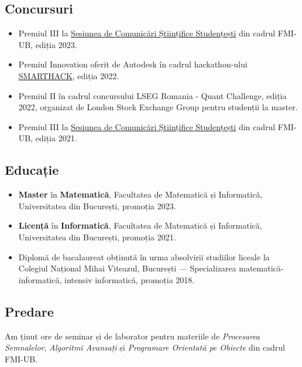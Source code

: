 \subsection*{Concursuri}

\begin{itemize}
    \item Premiul III la \href{https://fmi.unibuc.ro/sesiune-de-comunicari-stiintifice-studentesti/}{Sesiunea de Comunicări Științifice Studențești} din cadrul FMI-UB, ediția 2023.

    \item Premiul Innovation oferit de Autodesk în cadrul hackathon-ului \href{https://smarthack.asmi.ro/}{SMARTHACK}, ediția 2022.

    \item Premiul II în cadrul concursului LSEG Romania - Quant Challenge, ediția 2022, organizat de London Stock Exchange Group pentru studenții la master.

    \item Premiul III la \href{https://fmi.unibuc.ro/comunicari-stiintifice-studentesti-2021/}{Sesiunea de Comunicări Științifice Studențești} din cadrul FMI-UB, ediția 2021.
\end{itemize}

\subsection*{Educație}

\begin{itemize}
    \item \textbf{Master} în \textbf{Matematică}, Facultatea de Matematică și Informatică, Universitatea din București, promoția 2023.

    \item \textbf{Licență} în \textbf{Informatică}, Facultatea de Matematică și Informatică, Universitatea din București, promoția 2021.

    \item Diplomă de bacalaureat obținută în urma absolvirii studiilor liceale la Colegiul Național Mihai Viteazul, București --- Specializarea matematică-informatică, intensiv informatică, promoția 2018.
\end{itemize}

\subsection*{Predare}

Am ținut ore de seminar și de laborator pentru materiile de \emph{Procesarea Semnalelor}, \emph{Algoritmi Avansați} și \emph{Programare Orientată pe Obiecte} din cadrul FMI-UB.
